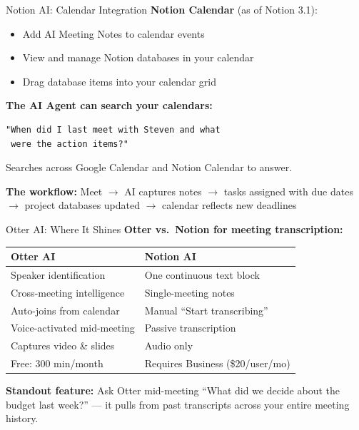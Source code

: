\documentclass[aspectratio=169]{beamer}
\begin{document}
\begin{frame}[fragile]{Notion AI: Calendar Integration}
    \textbf{Notion Calendar} (as of Notion 3.1):
    \begin{itemize}
        \item Add AI Meeting Notes to calendar events
        \item View and manage Notion databases in your calendar
        \item Drag database items into your calendar grid
    \end{itemize}

    \vspace{1em}
    \textbf{The AI Agent can search your calendars:}

    \vspace{0.5em}
    \begin{lstlisting}[basicstyle=\ttfamily\small]
"When did I last meet with Steven and what
 were the action items?"
    \end{lstlisting}

    \vspace{0.5em}
    Searches across Google Calendar and Notion Calendar to answer.

    \vspace{1em}
    \textbf{The workflow:} Meet $\rightarrow$ AI captures notes $\rightarrow$ tasks assigned with due dates $\rightarrow$ project databases updated $\rightarrow$ calendar reflects new deadlines
\end{frame}

\begin{frame}{Otter AI: Where It Shines}
    \textbf{Otter vs.\ Notion for meeting transcription:}

    \vspace{0.5em}
    \begin{table}
        \centering
        \begin{tabular}{p{5.5cm}p{5.5cm}}
            \toprule
            \textbf{Otter AI} & \textbf{Notion AI} \\
            \midrule
            Speaker identification & One continuous text block \\
            Cross-meeting intelligence & Single-meeting notes \\
            Auto-joins from calendar & Manual ``Start transcribing'' \\
            Voice-activated mid-meeting & Passive transcription \\
            Captures video \& slides & Audio only \\
            Free: 300 min/month & Requires Business (\$20/user/mo) \\
            \bottomrule
        \end{tabular}
    \end{table}

    \vspace{0.5em}
    \textbf{Standout feature:} Ask Otter mid-meeting ``What did we decide about the budget last week?'' --- it pulls from past transcripts across your entire meeting history.
\end{frame}
\end{document}
